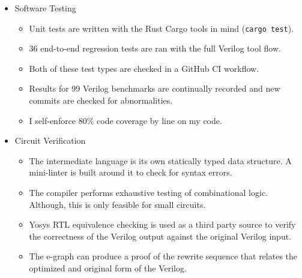 \documentclass[10pt,letterpaper]{article}
\begin{document}
\begin{itemize}
    \item Software Testing
          \begin{itemize}
              \item Unit tests are written with the Rust Cargo tools in mind (\texttt{cargo test}).
              \item 36 end-to-end regression tests are ran with the full Verilog tool flow.
              \item Both of these test types are checked in a GitHub CI workflow.
              \item Results for 99 Verilog benchmarks are continually recorded and new commits are
                    checked for abnormalities.
              \item I self-enforce 80\% code coverage by line on my code.
          \end{itemize}
    \item Circuit Verification
          \begin{itemize}
              \item The intermediate language is its own statically typed data structure. A
                    mini-linter is built around it to check for syntax errors.
              \item The compiler performs exhaustive testing of combinational logic. Although, this
                    is only feasible for small circuits.
              \item Yosys RTL equivalence checking is used as a third party source to verify the
                    correctness of the Verilog output against the original Verilog input.
              \item The e-graph can produce a proof of the rewrite sequence that relates the
                    optimized and original form of the Verilog.
          \end{itemize}
\end{itemize}

\nocite{*}


\end{document}
